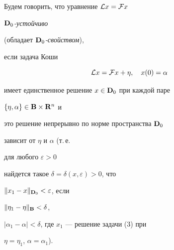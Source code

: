 \begin{defn}


Будем говорить, что уравнение ${\cal L}x={\cal F}x$\;


{\it ${\bold {D}}_0$-устойчиво}


(обладает {\it ${\bold {D}}_0$-свойством}),


если задача Коши


\begin{equation}


{\cal L}x={\cal F}x+\eta,\quad x(0)=\alpha


\end{equation}


имеет единственное решение $x\in{\bold {D}}_0$ при каждой паре


$\{\eta,\alpha\}\in\bold {B}\times\bold {R}^n$ и


это решение непрерывно по норме пространства $\bold {D}_0$


зависит от $\eta$ и $\alpha$ (т.\,е.


для любого $\varepsilon>0$


найдется такое $\delta=\delta(x,\varepsilon)>0$, что


$\|x_1-x\|_{\bold{D}_0}<\varepsilon$, если


$\|\eta_1-\eta\|_{\bold B}<\delta$,


$|\alpha_1-\alpha|<\delta$, где $x_1$ --- решение задачи (3) при


$\eta=\eta_1$, $\alpha=\alpha_1$).


\end{defn}





